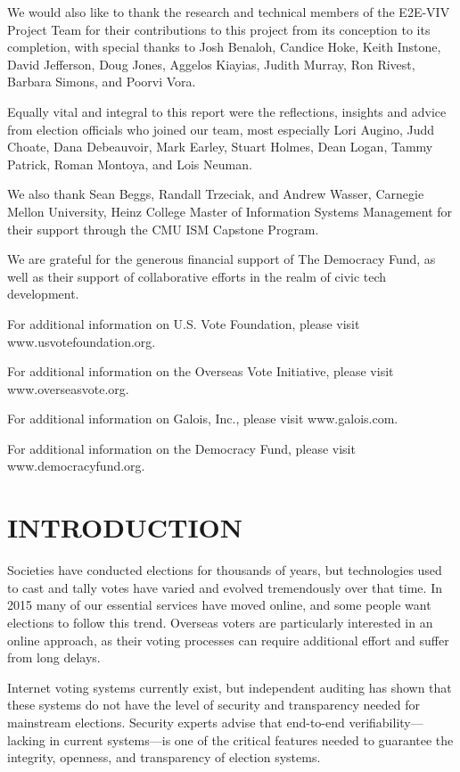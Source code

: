 We would also like to thank the research and technical members of the
E2E-VIV Project Team for their contributions to this project from its
conception to its completion, with special thanks to Josh Benaloh,
Candice Hoke, Keith Instone, David Jefferson, Doug Jones, Aggelos
Kiayias, Judith Murray, Ron Rivest, Barbara Simons, and Poorvi Vora. 

Equally vital and integral to this report were the reflections,
insights and advice from election officials who joined our team, most
especially Lori Augino, Judd Choate, Dana Debeauvoir, Mark Earley,
Stuart Holmes, Dean Logan, Tammy Patrick, Roman Montoya, and Lois
Neuman.

We also thank Sean Beggs, Randall Trzeciak, and Andrew Wasser,
Carnegie Mellon University, Heinz College Master of Information
Systems Management for their support through the CMU ISM Capstone
Program. 

We are grateful for the generous financial support of The Democracy
Fund, as well as their support of collaborative efforts in the realm
of civic tech development. 

For additional information on U.S. Vote Foundation, please visit
www.usvotefoundation.org.   

For additional information on the Overseas Vote Initiative, please
visit www.overseasvote.org. 

For additional information on Galois, Inc., please visit
www.galois.com.

For additional information on the Democracy Fund, please visit
www.democracyfund.org.  

\newpage

\section*{INTRODUCTION}

Societies have conducted elections for thousands of years, but
technologies used to cast and tally votes have varied and evolved
tremendously over that time. In 2015 many of our essential services
have moved online, and some people want elections to follow this
trend. Overseas voters are particularly interested in an online
approach, as their voting processes can require additional effort and
suffer from long delays.

Internet voting systems currently exist, but independent auditing has
shown that these systems do not have the level of security and
transparency needed for mainstream elections. Security experts advise
that end-to-end verifiability—lacking in current systems—is one of the
critical features needed to guarantee the integrity, openness, and
transparency of election systems.

